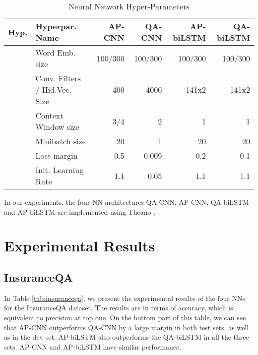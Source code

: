 \documentclass{article}
\begin{document}
\begin{table*}[ht!]
\caption{Neural Network Hyper-Parameters}
\label{tab:nn_hyperparams}
\vskip 0.15in
\begin{center}
\begin{small}
\begin{sc}
\begin{tabular}{llrrrr}
\hline
\abovespace\belowspace
\bf Hyp. & \bf Hyperpar. Name  & \bf AP-CNN & \bf QA-CNN & \bf AP-biLSTM & \bf QA-biLSTM \\
\hline
          & Word Emb. size        & 100/300 & 100/300 & 100/300 & 100/300 \\
          & Conv. Filters / Hid.Vec. Size         & 400     & 4000    & 141x2 & 141x2 \\ 
          & Context Window size   & 3/4     & 2       & 1 & 1 \\ 
        & Minibatch size        & 20      & 1       & 20 & 20 \\
          & Loss margin           & 0.5     & 0.009   & 0.2 & 0.1 \\
    & Init. Learning Rate & 1.1       & 0.05    & 1.1 & 1.1 \\
\hline
\end{tabular}
\end{sc}
\end{small}
\end{center}
\vskip -0.1in
\end{table*}

In our experiments, 
the four NN architectures QA-CNN, 
AP-CNN, 
QA-biLSTM 
and AP-biLSTM are implemented using Theano \cite{bergstra:scipy2010}.
 \section{Experimental Results}
\label{experimental_results}

\subsection{InsuranceQA}
In Table \ref{tab:insuranceqa},
we present the experimental results of the four NNs for the InsuranceQA dataset.
The results are in terms of accuracy,
which is equivalent to precision at top one.
On the bottom part of this table,
we can see that AP-CNN outperforms QA-CNN by a large margin in both test sets,
as well as in the dev set.
AP-biLSTM also outperforms the QA-biLSTM in all the three sets.
AP-CNN and AP-biLSTM have similar performance.
\end{document}
